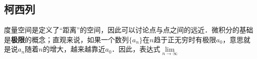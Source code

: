

\subsection{柯西列}

度量空间是定义了“距离”的空间，因此可以讨论点与点之间的远近．微积分的基础是\textbf{极限}的概念；直观来说，如果一个数列$\{a_n\}$在$n$趋于正无穷时有极限$a_0$，意思就是说$a_n$随着$n$的增大，越来越靠近$a_0$．因此，表达式$\lim\limits_{n\rightarrow\infty}$